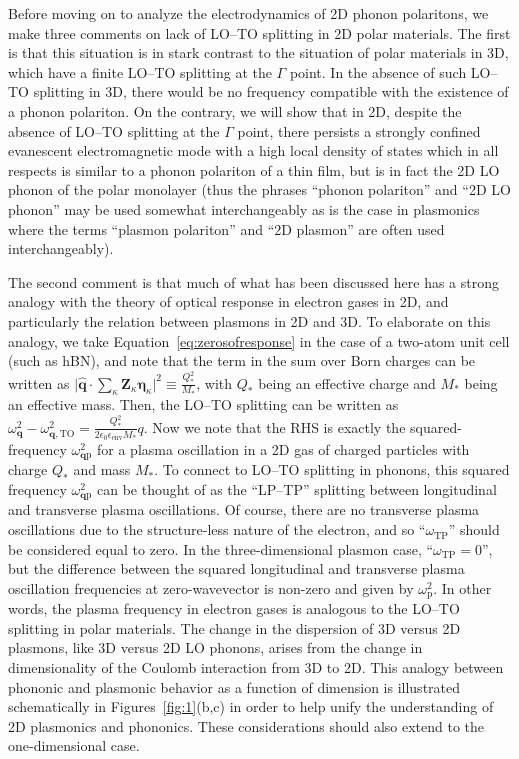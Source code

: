 \documentclass[aps,prb,twocolumn,
	           groupedaddress,superscriptaddress,
               amsfonts,amssymb,amsmath,floatfix,
	           citeautoscript]{revtex4-1}
\begin{document}
Before moving on to analyze the electrodynamics of 2D phonon polaritons, we make three comments on lack of LO--TO splitting in 2D polar materials. The first is that this situation is in stark contrast to the situation of polar materials in 3D, which have a finite LO--TO splitting at the $\Gamma$ point. In the absence of such LO--TO splitting in 3D, there would be no frequency compatible with the existence of a phonon  polariton. On the contrary, we will show that in 2D, despite the absence of LO--TO splitting at the $\Gamma$ point, there persists a strongly confined evanescent electromagnetic mode with a high local density of states which in all respects is similar to a phonon polariton of a thin film, but is in fact the 2D LO phonon of the polar monolayer (thus the phrases ``phonon polariton'' and ``2D LO phonon'' may be used somewhat interchangeably as is the case in plasmonics where the terms ``plasmon polariton'' and ``2D plasmon'' are often used interchangeably).

The second comment is that much of what has been discussed here has a strong analogy with the theory of optical response in electron gases in 2D, and particularly the relation between plasmons in 2D and 3D. To elaborate on this analogy, we take Equation~\eqref{eq:zerosofresponse} in the case of a two-atom unit cell (such as hBN), and note that the term in the sum over Born charges can be written as $\Big|\hat{\mathbf{q}}\cdot \sum_\kappa \mathbf{Z}_\kappa\boldsymbol{\eta}_\kappa\Big|^2 \equiv \frac{Q_*^2}{M_*}$, with $Q_*$ being an effective charge and $M_*$ being an effective mass. Then, the LO--TO splitting can be written as $\omega^2_{\mathbf{q}} - \omega^2_{\mathbf{q},\mathrm{TO}} = \frac{Q_*^2}{2\epsilon_0\epsilon_{\mathrm{env}} M_*}q$. Now we note that the RHS is exactly the squared-frequency $\omega^2_{\mathbf{q}\mathrm{p}}$ for a plasma oscillation in a 2D gas of charged particles with charge $Q_*$ and mass $M_*$. To connect to LO--TO splitting in phonons, this squared frequency $\omega^2_{\mathbf{q}\mathrm{p}}$ can be thought of as the ``LP--TP'' splitting between longitudinal and transverse plasma oscillations. Of course, there are no transverse plasma oscillations due to the structure-less nature of the electron, and so ``$\omega_{\mathrm{TP}}$''  should be considered equal to zero. In the three-dimensional plasmon case, ``$\omega_{\mathrm{TP}} = 0$'', but the difference between the squared longitudinal and transverse plasma oscillation frequencies at zero-wavevector is non-zero and given by $\omega_{\mathrm{p}}^2$. In other words, the plasma frequency in electron gases is analogous to the LO--TO splitting in polar materials. The change in the dispersion of 3D versus 2D plasmons, like 3D versus 2D LO phonons, arises from the change in dimensionality of the Coulomb interaction from 3D to 2D.  This analogy between phononic and plasmonic behavior as a function of dimension is illustrated schematically in Figures~\ref{fig:1}(b,c) in order to help unify the understanding of 2D plasmonics and phononics. These considerations should also extend to the one-dimensional case.
\end{document}

